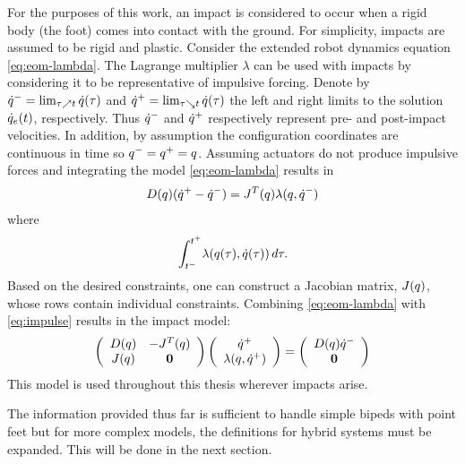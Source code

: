 For the purposes of this work, an impact is considered to occur when a rigid
body (the foot) comes into contact with the ground.
%
For simplicity, impacts are assumed to be rigid and plastic.
%
Consider the extended robot dynamics equation \eqref{eq:eom-lambda}.
%
The Lagrange multiplier $\lambda$ can be used with impacts by considering it to
be representative of impulsive forcing.
%
Denote by $\dot{q}^{-} = \lim_{\tau \nearrow t} \dot{q}(\tau)$ and $\dot{q}^{+} = \lim_{\tau
  \searrow t} \dot{q}(\tau)$ the left and right limits to the solution
$\dot{q}_{e}(t)$, respectively.
%
Thus $\dot{q}^{-}$ and $\dot{q}^{+}$ respectively represent pre- and post-impact velocities.
%
In addition, by assumption the configuration coordinates are continuous in time
so $q^{-} = q^{+} = q$.
%
Assuming actuators do not produce impulsive forces and integrating the model
\eqref{eq:eom-lambda} results in
\begin{align}
  \label{eq:impulse}
  D(q)(\dot{q}^{+} - \dot{q}^{-}) = J^{T}(q) \lambda(q, \dot{q}^{-})
\end{align}
where
\begin{align*}
  \int_{t^{-}}^{t^{+}} \! \lambda(q(\tau), \dot{q}(\tau)) \, d\tau.
\end{align*}
%
Based on the desired constraints, one can construct a Jacobian matrix,
$J(q)$, whose rows contain individual constraints.
%
Combining \eqref{eq:eom-lambda} with \eqref{eq:impulse} results in the impact model:
\begin{align*}
  \left(\begin{array}{c c}
      D(q) & -J^{T}(q)\\
      J(q) & {\mathbf 0}
    \end{array}\right)
  \left(\begin{array}{c}
      \dot{q}^{+}\\
      \lambda(q, \dot{q}^{+})
    \end{array}\right) =
  \left(\begin{array}{c}
      D(q) \dot{q}^{-}\\
      {\mathbf 0}
    \end{array}\right)
\end{align*}
%
This model is used throughout this thesis wherever impacts arise.

The information provided thus far is sufficient to handle simple bipeds with
point feet but for more complex models, the definitions for hybrid systems must
be expanded.
%
This will be done in the next section.




